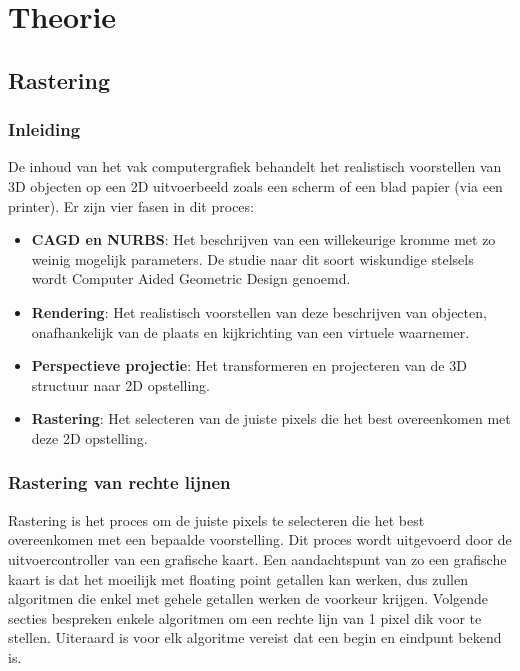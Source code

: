 \documentclass{report}
\begin{document}
	\tableofcontents
	
	\part{Theorie}
	\chapter{Rastering}
	\section{Inleiding}
	De inhoud van het vak computergrafiek behandelt het realistisch voorstellen van 3D objecten op een 2D uitvoerbeeld zoals een scherm of een blad papier (via een printer). Er zijn vier fasen in dit proces:
	\begin{itemize}
		\item \textbf{CAGD en NURBS}: Het beschrijven van een willekeurige kromme met zo weinig mogelijk parameters. De studie naar dit soort wiskundige stelsels wordt Computer Aided Geometric Design genoemd.
		\item \textbf{Rendering}: Het realistisch voorstellen van deze beschrijven van objecten, onafhankelijk van de plaats en kijkrichting van een virtuele waarnemer.
		\item \textbf{Perspectieve projectie}: Het transformeren en projecteren van de 3D structuur naar 2D opstelling.
		\item \textbf{Rastering}: Het selecteren van de juiste pixels die het best overeenkomen met deze 2D opstelling. 
	\end{itemize}

	\section{Rastering van rechte lijnen}
	Rastering is het proces om de juiste pixels te selecteren die het best overeenkomen met een bepaalde voorstelling. Dit proces wordt uitgevoerd door de uitvoercontroller van een grafische kaart. Een aandachtspunt van zo een grafische kaart is dat het moeilijk met floating point getallen kan werken, dus zullen algoritmen die enkel met gehele getallen werken de voorkeur krijgen. Volgende secties bespreken enkele algoritmen om een rechte lijn van 1 pixel dik voor te stellen. Uiteraard is voor elk algoritme vereist dat een begin en eindpunt bekend is.
\end{document}
